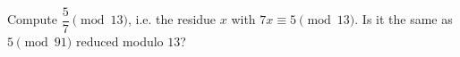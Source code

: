 Compute $\dfrac57\pmod{13}$, i.e. the residue $x$ with $7x\equiv5\pmod{13}$. Is it the same as $5\pmod{91}$ reduced modulo $13$?
